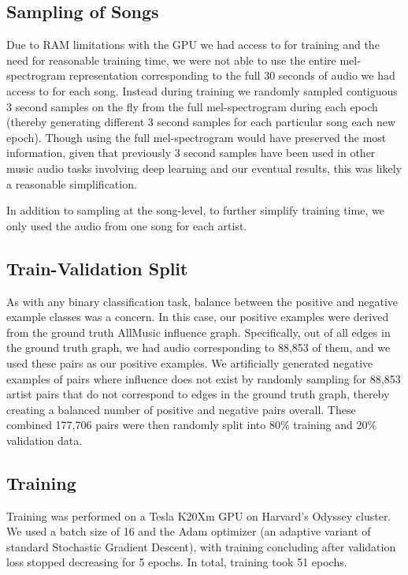 \subsection{Sampling of Songs}
Due to RAM limitations with the GPU we had access to for training and the need for reasonable training time, we were not able to use the entire mel-spectrogram representation corresponding to the full 30 seconds of audio we had access to for each song. Instead during training we randomly sampled contiguous 3 second samples on the fly from the full mel-spectrogram during each epoch (thereby generating different 3 second samples for each particular song each new epoch). Though using the full mel-spectrogram would have preserved the most information, given that previously \cite{van2013deep} 3 second samples have been used in other music audio tasks involving deep learning and our eventual results, this was likely a reasonable simplification.

In addition to sampling at the song-level, to further simplify training time, we only used the audio from one song for each artist. 

\subsection{Train-Validation Split}
As with any binary classification task, balance between the positive and negative example classes was a concern. In this case, our positive examples were derived from the ground truth AllMusic influence graph. Specifically, out of all edges in the ground truth graph, we had audio corresponding to 88,853 of them, and we used these pairs as our positive examples. We artificially generated negative examples of pairs where influence does not exist by randomly sampling for 88,853 artist pairs that do not correspond to edges in the ground truth graph, thereby creating a balanced number of positive and negative pairs overall. These combined 177,706 pairs were then randomly split into 80\% training and 20\% validation data. 

\subsection{Training}
Training was performed on a Tesla K20Xm GPU on Harvard's Odyssey cluster. We used a batch size of 16 and the Adam optimizer \cite{kingma2014adam} (an adaptive variant of standard Stochastic Gradient Descent), with training concluding after validation loss stopped decreasing for 5 epochs. In total, training took 51 epochs. 


